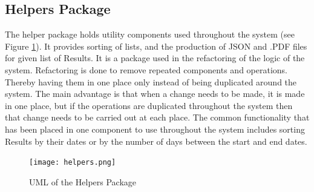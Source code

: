 \subsection{Helpers Package}
\par The helper package holds utility components used throughout the system (see Figure \ref{fig:helpers}). It provides sorting of lists, and the production of JSON and .PDF files for given list of Results. It is a package used in the refactoring of the logic of the system. Refactoring is done to remove repeated components and operations. Thereby having them in one place only instead of being duplicated around the system. The main advantage is that when a change needs to be made, it is made in one place, but if the operations are duplicated throughout the system then that change needs to be carried out at each place. The common functionality that has been placed in one component to use throughout the system includes sorting Results by their dates or by the number of days between the start and end dates.
\begin{figure}[H]
\caption{UML of the Helpers Package}
\label{fig:helpers}
\texttt{[image: helpers.png]}
\centering
\end{figure}
